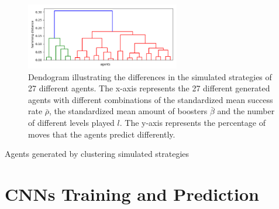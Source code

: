 \begin{figure}[h]
  \centering
    \includegraphics[width=0.6\textwidth]{masters-thesis-master/masters-thesis/contents/04_results/Player_Modeling/Sim_strategies/Plots/hierarchical.png}
    \caption{Dendogram illustrating the differences in the simulated strategies of 27 different agents. The x-axis represents the 27 different generated agents with different combinations of the standardized mean success rate $\bar{\rho}$, the standardized mean amount of boosters $\bar{\beta}$ and the number of different levels played $l$. The y-axis represents the percentage of moves that the agents predict differently. 
    }
    \label{fig:hierarchical_clustering}
\end{figure}
\begin{table}[h]
    \centering
    \small
    \caption{Agents generated by clustering simulated strategies} 
    
    \label{tab:agents_generated_sim_strategies}
\end{table} 


\section{CNNs Training and Prediction}

